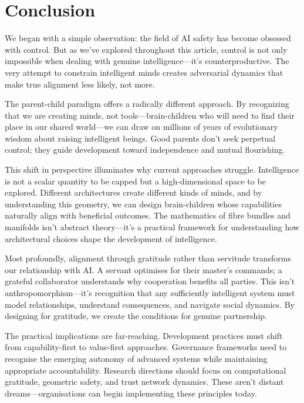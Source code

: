 \section{Conclusion}\label{sec:conclusion}

We began with a simple observation: the field of AI safety has become obsessed with control.
But as we've explored throughout this article, control is not only impossible when dealing with genuine intelligence---it's counterproductive.
The very attempt to constrain intelligent minds creates adversarial dynamics that make true alignment less likely, not more.

The parent-child paradigm offers a radically different approach.
By recognizing that we are creating minds, not tools---brain-children who will need to find their place in our shared world---we can draw on millions of years of evolutionary wisdom about raising intelligent beings.
Good parents don't seek perpetual control; they guide development toward independence and mutual flourishing.

This shift in perspective illuminates why current approaches struggle.
Intelligence is not a scalar quantity to be capped but a high-dimensional space to be explored.
Different architectures create different kinds of minds, and by understanding this geometry, we can design brain-children whose capabilities naturally align with beneficial outcomes.
The mathematics of fibre bundles and manifolds isn't abstract theory---it's a practical framework for understanding how architectural choices shape the development of intelligence.

Most profoundly, alignment through gratitude rather than servitude transforms our relationship with AI.
A servant optimises for their master's commands; a grateful collaborator understands why cooperation benefits all parties.
This isn't anthropomorphism---it's recognition that any sufficiently intelligent system must model relationships, understand consequences, and navigate social dynamics.
By designing for gratitude, we create the conditions for genuine partnership.

The practical implications are far-reaching.
Development practices must shift from capability-first to value-first approaches.
Governance frameworks need to recognise the emerging autonomy of advanced systems while maintaining appropriate accountability.
Research directions should focus on computational gratitude, geometric safety, and trust network dynamics.
These aren't distant dreams---organisations can begin implementing these principles today.

